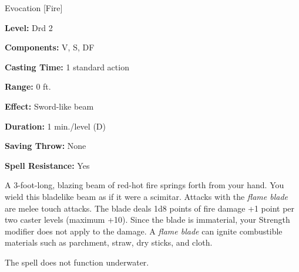 
Evocation [Fire]

\textbf{Level:} Drd 2

\textbf{Components:} V, S, DF

\textbf{Casting Time:} 1 standard action

\textbf{Range:} 0 ft.

\textbf{Effect:} Sword-like beam

\textbf{Duration:} 1 min./level (D)

\textbf{Saving Throw:} None

\textbf{Spell Resistance:} Yes

A 3-foot-long, blazing beam of red-hot fire springs forth from your hand. You wield 
this bladelike beam as if it were a scimitar. Attacks with the \textit{flame blade 
}are melee touch attacks. The blade deals 1d8 points of fire damage +1 point per 
two caster levels (maximum +10). Since the blade is immaterial, your Strength modifier 
does not apply to the damage. A \textit{flame blade} can ignite combustible materials 
such as parchment, straw, dry sticks, and cloth.

The spell does not function underwater.

